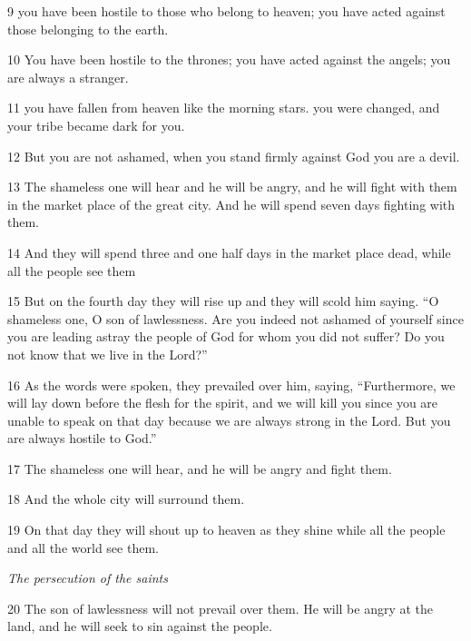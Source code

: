 \par 9 you have been hostile to those who belong to heaven; you have acted against those belonging to the earth.

\par 10 You have been hostile to the thrones; you have acted against the angels; you are always a stranger.

\par 11 you have fallen from heaven like the morning stars. you were changed, and your tribe became dark for you.

\par 12 But you are not ashamed, when you stand firmly against God you are a devil.

\par 13 The shameless one will hear and he will be angry, and he will fight with them in the market place of the great city. And he will spend seven days fighting with them.

\par 14 And they will spend three and one half days in the market place dead, while all the people see them

\par 15 But on the fourth day they will rise up and they will scold him saying. “O shameless one, O son of lawlessness. Are you indeed not ashamed of yourself since you are leading astray the people of God for whom you did not suffer? Do you not know that we live in the Lord?”

\par 16 As the words were spoken, they prevailed over him, saying, “Furthermore, we will lay down before the flesh for the spirit, and we will kill you since you are unable to speak on that day because we are always strong in the Lord. But you are always hostile to God.”

\par 17 The shameless one will hear, and he will be angry and fight them.

\par 18 And the whole city will surround them.

\par 19 On that day they will shout up to heaven as they shine while all the people and all the world see them.


\par \textit{The persecution of the saints}

\par 20 The son of lawlessness will not prevail over them. He will be angry at the land, and he will seek to sin against the people.

